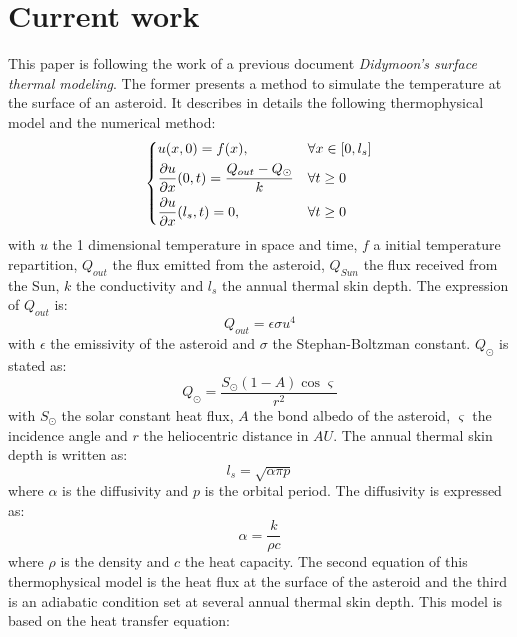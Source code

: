 \section{Current work}
\label{currentwork}

This paper is following the work of a previous document \textit{Didymoon's surface thermal modeling}. The former presents a method to simulate the temperature at the surface of an asteroid. It describes in details the following thermophysical model and the numerical method:
\begin{equation}
    \begin{dcases}
        u(x,0)=f(x),                                                  & \forall x\in[0,l_s] \\
        \frac{\partial{u}}{\partial{x}}(0,t)=\frac{Q_{out}-Q_{\odot}}{k} & \forall t\geq0      \\
        \frac{\partial{u}}{\partial{x}}(l_s,t)=0,                     & \forall t\geq0
    \end{dcases}
    \label{eq:2.1}
\end{equation}
with $u$ the 1 dimensional temperature in space and time, $f$ a initial temperature repartition, $Q_{out}$ the flux emitted from the asteroid, $Q_{Sun}$ the flux received from the Sun, $k$ the conductivity and $l_s$ the annual thermal skin depth. The expression of $Q_{out}$ is:
\begin{equation}
    Q_{out}=\epsilon\sigma u^4
    \label{eq:2.2}
\end{equation}
with $\epsilon$ the emissivity of the asteroid and $\sigma$ the Stephan-Boltzman constant. $Q_{\odot}$ is stated as:
\begin{equation}
    Q_{\odot}=\frac{S_{\odot}\left(1-A\right)\cos{\varsigma}}{r^2}
    \label{eq:2.3}
\end{equation}
with $S_{\odot}$ the solar constant heat flux, $A$ the bond albedo of the asteroid, $\varsigma$ the incidence angle and $r$ the heliocentric distance in $AU$. The annual thermal skin depth is written as:
\begin{equation}
    l_s=\sqrt{\alpha\pi p}
    \label{eq:2.4}
\end{equation}
where $\alpha$ is the diffusivity and $p$ is the orbital period. The diffusivity is expressed as:
\begin{equation}
    \alpha=\frac{k}{\rho c}
    \label{eq:2.5}
\end{equation}
where $\rho$ is the density and $c$ the heat capacity. The second equation of this thermophysical model is the heat flux at the surface of the asteroid and the third is an adiabatic condition set at several annual thermal skin depth. This model is based on the heat transfer equation:
